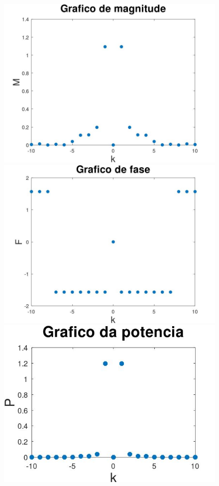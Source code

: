 \documentclass{article}
\begin{document}
\begin{figure}[h!]
    \includegraphics[scale=0.3]{plot4dm}
    \includegraphics[scale=0.3]{plot4df}
    \includegraphics[scale=0.43]{plot4dp}
    \centering
\end{figure}
\end{document}
